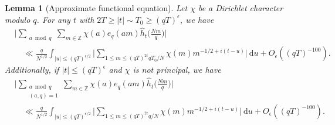 \documentclass[12pt]{amsart}
\newtheorem{lemma}[theorem]{Lemma}
\theoremstyle{definition}
\theoremstyle{plain}
\theoremstyle{remark}
\numberwithin{equation}{section}
\numberwithin{theorem}{section}
\numberwithin{equation}{section}
\begin{document}
	\begin{lemma}[Approximate functional equation]\label{apfe}
		Let $\chi$ be a Dirichlet character modulo $q$. For any $t$ with $2T \geq |t|\sim T_{0}\geq (qT)^{\epsilon}$, we have 
		\begin{align*}
			&\bigg| \sum_{\substack{a \bmod q}}\sum_{m \in \mathbb {Z}}\chi(a)e_q(am)\hat{h}_{t}\bigg(\frac{Nm}{q}\bigg)\bigg|
			\\
			&\quad \ll\frac{q}{N^{1/2}}\int_{|u|\leq (qT)^{\epsilon/2}}\bigg|\sum_{1\leq m \leq (qT)^{2\epsilon}qT_{0}/N}\chi(m)m^{-1/2+i(t-u)}\bigg|\:\mathrm{d}u +O_{\epsilon}((qT)^{-100}).
		\end{align*}
		Additionally, if $|t|\leq (qT)^{\epsilon}$ and $\chi$ is not principal, we have
		\begin{align*}
			&\bigg| \sum_{\substack{a \bmod q \\ (a, q)=1}}\sum_{m \in \mathbb {Z}}\chi(a)e_q(am)\hat{h}_{t}\bigg(\frac{Nm}{q}\bigg)\bigg|
			\\
			&\quad \ll\frac{q}{N^{1/2}}\int_{|u|\leq (qT)^{\epsilon/2}}\bigg|\sum_{1\leq m \leq (qT)^{2\epsilon}q/N}\chi(m)m^{-1/2+i(t-u)}\bigg|\:\mathrm{d}u +O_{\epsilon}((qT)^{-100}).
		\end{align*}
	\end{lemma}
\end{document}
